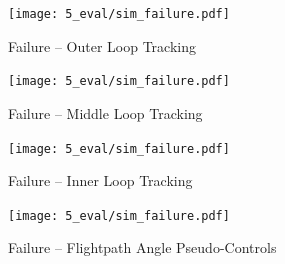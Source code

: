 \documentclass[12pt]{ucthesis}
\begin{document}
\begin{figure}
	\begin{minipage}[b]{0.5\textheight}%
	\centering
		\begin{flushright}%
			\centering
			\texttt{[image: 5\_eval/sim\_failure.pdf]}%
			\caption{Failure -- Outer Loop Tracking}
			\label{fig: sim_fail_ol}
		\end{flushright}%
	\end{minipage}%
	\hspace{0.5cm}%
	\begin{minipage}[b]{0.5\textheight}%
		\begin{flushleft}%
			\centering
			\texttt{[image: 5\_eval/sim\_failure.pdf]}%
			\caption{Failure -- Middle Loop Tracking}
			\label{fig: sim_fail_ml}
		\end{flushleft}%
	\end{minipage}%
\end{figure}

\begin{figure}
	\begin{minipage}[b]{0.5\textheight}%
	\centering
		\begin{flushright}%
			\centering
			\texttt{[image: 5\_eval/sim\_failure.pdf]}%
			\caption{Failure -- Inner Loop Tracking}
			\label{fig: sim_fail_il}
		\end{flushright}%
	\end{minipage}%
	\hspace{0.5cm}%
	\begin{minipage}[b]{0.5\textheight}%
		\begin{flushleft}%
			\centering
			\texttt{[image: 5\_eval/sim\_failure.pdf]}%
			\caption{Failure -- Flightpath Angle Pseudo-Controls}
			\label{fig: sim_fail_XY}
		\end{flushleft}%
	\end{minipage}%
\end{figure}
\end{document}
